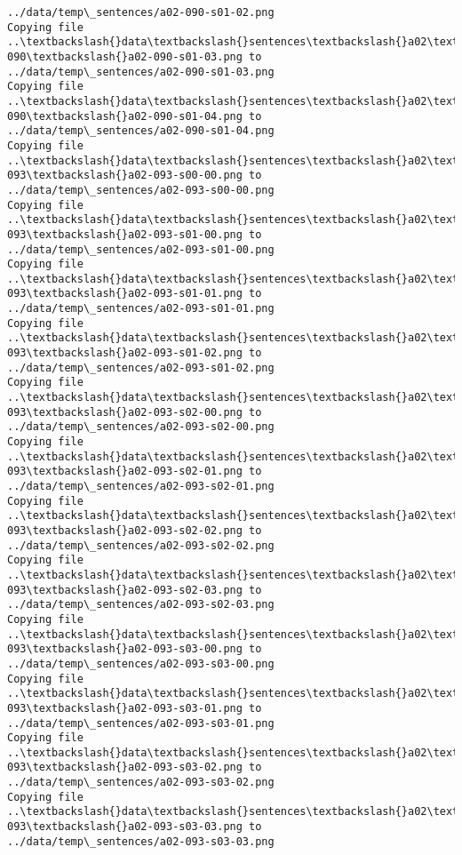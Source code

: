 \documentclass[11pt]{article}
\begin{document}
\begin{Verbatim}[commandchars=\\\{\}]
../data/temp\_sentences/a02-090-s01-02.png
Copying file ..\textbackslash{}data\textbackslash{}sentences\textbackslash{}a02\textbackslash{}a02-090\textbackslash{}a02-090-s01-03.png to
../data/temp\_sentences/a02-090-s01-03.png
Copying file ..\textbackslash{}data\textbackslash{}sentences\textbackslash{}a02\textbackslash{}a02-090\textbackslash{}a02-090-s01-04.png to
../data/temp\_sentences/a02-090-s01-04.png
Copying file ..\textbackslash{}data\textbackslash{}sentences\textbackslash{}a02\textbackslash{}a02-093\textbackslash{}a02-093-s00-00.png to
../data/temp\_sentences/a02-093-s00-00.png
Copying file ..\textbackslash{}data\textbackslash{}sentences\textbackslash{}a02\textbackslash{}a02-093\textbackslash{}a02-093-s01-00.png to
../data/temp\_sentences/a02-093-s01-00.png
Copying file ..\textbackslash{}data\textbackslash{}sentences\textbackslash{}a02\textbackslash{}a02-093\textbackslash{}a02-093-s01-01.png to
../data/temp\_sentences/a02-093-s01-01.png
Copying file ..\textbackslash{}data\textbackslash{}sentences\textbackslash{}a02\textbackslash{}a02-093\textbackslash{}a02-093-s01-02.png to
../data/temp\_sentences/a02-093-s01-02.png
Copying file ..\textbackslash{}data\textbackslash{}sentences\textbackslash{}a02\textbackslash{}a02-093\textbackslash{}a02-093-s02-00.png to
../data/temp\_sentences/a02-093-s02-00.png
Copying file ..\textbackslash{}data\textbackslash{}sentences\textbackslash{}a02\textbackslash{}a02-093\textbackslash{}a02-093-s02-01.png to
../data/temp\_sentences/a02-093-s02-01.png
Copying file ..\textbackslash{}data\textbackslash{}sentences\textbackslash{}a02\textbackslash{}a02-093\textbackslash{}a02-093-s02-02.png to
../data/temp\_sentences/a02-093-s02-02.png
Copying file ..\textbackslash{}data\textbackslash{}sentences\textbackslash{}a02\textbackslash{}a02-093\textbackslash{}a02-093-s02-03.png to
../data/temp\_sentences/a02-093-s02-03.png
Copying file ..\textbackslash{}data\textbackslash{}sentences\textbackslash{}a02\textbackslash{}a02-093\textbackslash{}a02-093-s03-00.png to
../data/temp\_sentences/a02-093-s03-00.png
Copying file ..\textbackslash{}data\textbackslash{}sentences\textbackslash{}a02\textbackslash{}a02-093\textbackslash{}a02-093-s03-01.png to
../data/temp\_sentences/a02-093-s03-01.png
Copying file ..\textbackslash{}data\textbackslash{}sentences\textbackslash{}a02\textbackslash{}a02-093\textbackslash{}a02-093-s03-02.png to
../data/temp\_sentences/a02-093-s03-02.png
Copying file ..\textbackslash{}data\textbackslash{}sentences\textbackslash{}a02\textbackslash{}a02-093\textbackslash{}a02-093-s03-03.png to
../data/temp\_sentences/a02-093-s03-03.png

\end{Verbatim}
\end{document}
